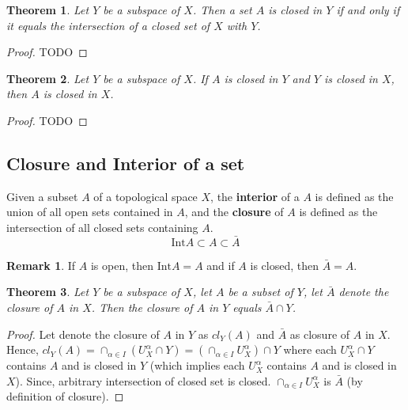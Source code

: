 \documentclass[12pt,reqno]{amsart}
\theoremstyle{plain}
\newtheorem{thm}{Theorem}
\theoremstyle{definition}
\newtheorem{rem}{Remark}
\begin{document}
\begin{thm}
    Let $Y$ be a subspace of $X$. Then a set $A$ is closed in $Y$ if and only if it equals the intersection of a closed set of $X$ with $Y$.
\end{thm}
\begin{proof}
    TODO
\end{proof}
\begin{thm}
    Let $Y$ be a subspace of $X$. If $A$ is closed in $Y$ and $Y$ is closed in $X$, then $A$ is closed in $X$.
\end{thm}
\begin{proof}
    TODO
\end{proof}

\subsection{Closure and Interior of a set}
Given a subset $A$ of a topological space $X$, the {\bf interior} of a $A$ is defined as the union of all open sets contained in $A$, and the {\bf closure} of $A$ is defined as the intersection of all closed sets containing $A$.
$$ \text{Int}A \subset A \subset \bar{A} $$

\begin{rem}
    If $A$ is open, then $\text{Int}A = A$ and if $A$ is closed, then $\bar{A} = A$.
\end{rem}

\begin{thm}
    Let $Y$ be a subspace of $X$, let $A$ be a subset of $Y$, let $\bar{A}$ denote the closure of $A$ in $X$. Then the closure of $A$ in $Y$ equals $\bar{A} \cap Y$.
\end{thm}
\begin{proof}
    Let denote the closure of $A$ in $Y$ as $cl_Y(A)$ and $\bar{A}$ as closure of $A$ in $X$. Hence, $cl_Y(A) = \cap_{\alpha \in I} (U_X^\alpha \cap Y) = (\cap_{\alpha \in I}U_X^{\alpha}) \cap Y$ where each $U_X^\alpha \cap Y$ contains $A$ and is closed in $Y$ (which implies each $U_X^\alpha$ contains $A$ and is closed in $X$). Since, arbitrary intersection of closed set is closed. $\cap_{\alpha \in I}U_X^{\alpha}$ is $\bar{A}$ (by definition of closure).
\end{proof}
\end{document}
